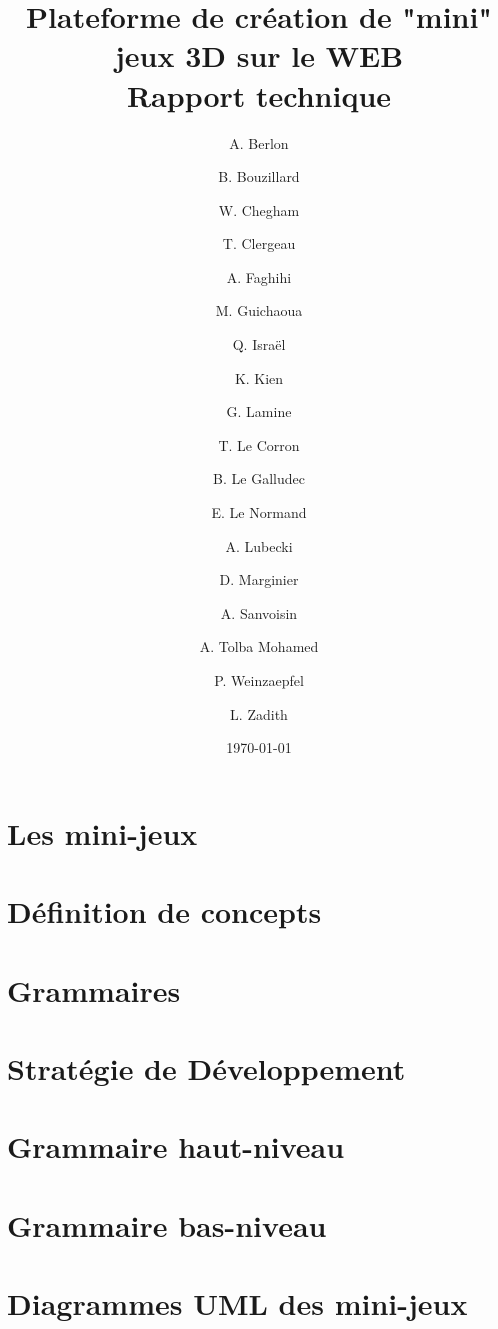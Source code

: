 \documentclass[a4paper,10pt]{article}
\title{Plateforme de création de "mini" jeux 3D sur le WEB \\ Rapport technique}
\author{
A. Berlon \and
B. Bouzillard \and
W. Chegham \and
T. Clergeau \and
A. Faghihi \and
M. Guichaoua \and
Q. Israël \and
K. Kien \and
G. Lamine \and
T. Le Corron \and
B. Le Galludec \and
E. Le Normand \and
A. Lubecki \and
D. Marginier \and
A. Sanvoisin \and
A. Tolba Mohamed \and
P. Weinzaepfel \and
L. Zadith}
\date{\today}
\begin{document}
 
\maketitle

 

\section{Les mini-jeux}
\label{sec:minijeux}


\section{Définition de concepts}
\label{sec:concept}


\section{Grammaires}
\label{sec:grammaire}


\section{Stratégie de Développement}
\label{sec:strategie}


\clearpage
\appendix

\section{Grammaire haut-niveau}
\label{sec:hautniveau}


\section{Grammaire bas-niveau}
\label{sec:basniveau}


\section{Diagrammes UML des mini-jeux}
\label{sec:uml}

\end{document}

